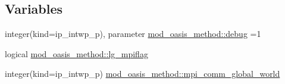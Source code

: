 \subsection*{Variables}
\begin{DoxyCompactItemize}
\item 
integer(kind=ip\+\_\+intwp\+\_\+p), parameter \hyperlink{namespacemod__oasis__method_a390290b92b6af57b2732cb7521532f1c}{mod\+\_\+oasis\+\_\+method\+::debug} =1
\item 
logical \hyperlink{namespacemod__oasis__method_a405af91a0535e4ce70d55513bb4c3867}{mod\+\_\+oasis\+\_\+method\+::lg\+\_\+mpiflag}
\item 
integer(kind=ip\+\_\+intwp\+\_\+p) \hyperlink{namespacemod__oasis__method_aff65fa61d2762374419fe4c44c0f9282}{mod\+\_\+oasis\+\_\+method\+::mpi\+\_\+comm\+\_\+global\+\_\+world}
\end{DoxyCompactItemize}
